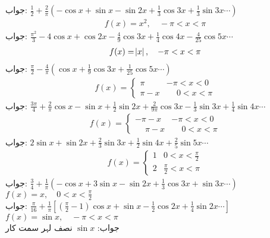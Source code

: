 جواب:\quad 
$\tfrac{1}{2}+\tfrac{2}{\pi}(-\cos x+\sin x-\sin 2x+\tfrac{1}{3}\cos 3x+\tfrac{1}{3}\sin 3x\cdots)$
\begin{align*}
f(x)=x^2,\quad -\pi<x<\pi
\end{align*}
جواب:\quad
$\tfrac{\pi^2}{3}-4\cos x+\cos 2x-\tfrac{4}{9}\cos 3x+\tfrac{1}{4}\cos 4x-\tfrac{4}{25}\cos 5x\cdots$
\begin{align*}
f(x)=\abs{x},\quad -\pi<x<\pi
\end{align*}
جواب:\quad
$\tfrac{\pi}{2}-\tfrac{4}{\pi}(\cos x+\tfrac{1}{9}\cos 3x+\tfrac{1}{25}\cos 5x\cdots)$
\begin{align*}
f(x)=
\begin{cases}
\pi & -\pi<x<0\\
\pi-x&\phantom{-}0<x<\pi
\end{cases}
\end{align*}
جواب:\quad
$\tfrac{3\pi}{4}+\tfrac{2}{\pi}\cos x-\sin x+\tfrac{1}{2}\sin 2x+\tfrac{2}{9\pi}\cos 3x-\tfrac{1}{3}\sin 3x+\tfrac{1}{4}\sin 4x\cdots$
\begin{align*}
f(x)=
\begin{cases}
-\pi-x & -\pi<x<0\\
\phantom{-}\pi-x&\phantom{-}0<x<\pi
\end{cases}
\end{align*}
جواب:\quad
$2\sin x+\sin 2x+\tfrac{2}{3}\sin 3x+\tfrac{1}{2}\sin 4x+\tfrac{2}{5}\sin 5x\cdots$
\begin{align*}
f(x)=
\begin{cases}
1& 0<x<\frac{\pi}{2}\\
2&\frac{\pi}{2}<x<\pi
\end{cases}
\end{align*}
جواب:\quad
$\tfrac{3}{4}+\tfrac{1}{\pi}(-\cos x+3\sin x-\sin 2x+\tfrac{1}{3}\cos 3x+\sin 3x\cdots)$
\quad
$f(x)=x,\quad  0<x<\frac{\pi}{2}$\\
جواب:\quad
$\tfrac{\pi}{16}+\tfrac{1}{\pi}[(\tfrac{\pi}{2}-1)\cos x+\sin x-\tfrac{1}{2}\cos 2x+\tfrac{1}{4}\sin 2x\cdots]$
\quad
$f(x)=\sin x,\quad -\pi<x<\pi$\\
جواب:\quad
$\sin x$
\quad نصف لہر سمت کار
